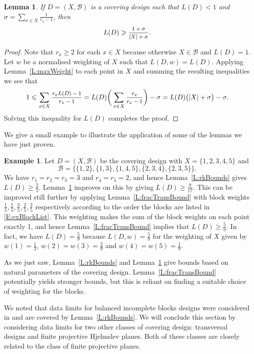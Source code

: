 \documentclass[11pt]{article}
\newtheorem{Lemma}[Theorem]{Lemma}
\theoremstyle{definition}
\newtheorem{Example}[Theorem]{Example}
\renewcommand{\leq}{\leqslant}
\renewcommand{\geq}{\geqslant}
\newcommand{\B}{{\ensuremath{\mathcal{B}}}}
\begin{document}
\begin{Lemma}\label{L:repSeqBound}
If $D = (X,\B)$ is a covering design such that $L(D)<1$ and $\sigma = \sum_{x \in X} \frac{1}{r_x-1}$, then
\[L(D) \geq \mfrac{1+\sigma}{|X|+\sigma}.\]
\end{Lemma}

\begin{proof}
Note that $r_x \geq 2$ for each $x \in X$ because otherwise $X \in \B$ and $L(D)=1$. Let $w$ be a normalised weighting of $X$ such that $L(D,w)=L(D)$. Applying Lemma~\ref{L:maxWeight} to each point in $X$ and summing the resulting inequalities we see that
\[1 \leq \sum_{x \in X}\mfrac{r_xL(D)-1}{r_x-1}=L(D)\biggl(\,\sum_{x \in X}\mfrac{r_x}{r_x-1}\biggr)-\sigma=L(D)\bigl(|X|+\sigma\bigr)-\sigma.\]
Solving this inequality for $L(D)$ completes the proof.
\end{proof}

We give a small example to illustrate the application of some of the lemmas we have just proven.

\begin{Example}
Let $D=(X,\B)$ be the covering design with $X=\{1,2,3,4,5\}$ and
\begin{equation}\label{E:exBlockList}
\B=\bigl\{\{1,2\},\{1,3\},\{1,4,5\},\{2,3,4\},\{2,3,5\}\bigr\}.
\end{equation}
We have $r_1=r_2=r_3=3$ and $r_4=r_5=2$, and hence Lemma~\ref{L:rkBounds} gives $L(D) \geq \frac{2}{5}$. Lemma~\ref{L:repSeqBound} improves on this by giving $L(D) \geq \frac{9}{17}$. This can be improved still further by applying Lemma~\ref{L:fracTransBound} with block weights $\frac{1}{5},\frac{1}{5},\frac{3}{5},\frac{2}{5},\frac{2}{5}$ respectively
according to the order the blocks are listed in \eqref{E:exBlockList}. This weighting makes the sum of the block weights on each point exactly 1, and hence Lemma~\ref{L:fracTransBound} implies that $L(D) \geq \frac{5}{9}$. In fact, we have $L(D)=\frac{5}{9}$ because $L(D,w)=\frac{5}{9}$ for the weighting of $X$ given by $w(1)=\frac{1}{3}$, $w(2)=w(3)=\frac{2}{9}$ and $w(4)=w(5)=\frac{1}{9}$.
\end{Example}

As we just saw, Lemma~\ref{L:rkBounds} and Lemma~\ref{L:repSeqBound} give bounds based on natural parameters of the covering design. Lemma~\ref{L:fracTransBound} potentially yields stronger bounds, but this is reliant on finding a suitable choice of weighting for the blocks.

We noted that data limits for balanced incomplete blocks designs were considered in \cite{HalKelTia} and are covered by Lemma~\ref{L:rkBounds}. We will conclude this section by considering data limits for two other classes of covering design: transversal designs and finite projective Hjelmslev planes. Both of these classes are closely related to the class of finite projective planes.
\end{document}
